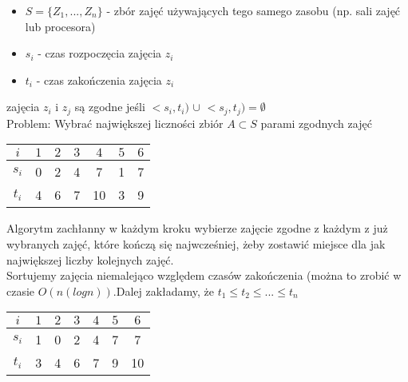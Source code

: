 \begin{itemize}
\item $S = \{ Z_1,...,Z_n \}$ - zbór zajęć używających tego samego zasobu (np. sali zajęć lub procesora) 
\item $s_i$ - czas rozpoczęcia zajęcia $z_i$
\item $t_i$ - czas zakończenia zajęcia $z_i$
\end{itemize}
zajęcia $z_i$ i $z_j$ są zgodne jeśli $<s_i,t_i)$ $\cup$ $<s_j,t_j) = \emptyset$ \\
Problem: Wybrać największej liczności zbiór $A \subset S$ parami zgodnych zajęć
\begin{center}
\begin{tabular}{ c | c | c | c | c | c | c }
  $i$ & $1$	& $2$ & $3$ & $4$ & $5$ & $6$ \\ \hline
  $s_i$ & 0	&  2  & 4 	& 7 & 1 & 7 \\ \hline
  $t_i$ & 4	&  6  & 7 	& 10 & 3 & 9 \\  
\end{tabular}
\end{center}

Algorytm zachłanny w każdym kroku wybierze zajęcie zgodne z każdym z już wybranych zajęć, które kończą się najwcześniej, żeby zostawić miejsce dla jak największej liczby kolejnych zajęć.\\
Sortujemy zajęcia niemalejąco względem czasów zakończenia (można to zrobić w czasie $O(n(logn))$.Dalej zakładamy, że $t_1 \leq t_2 \leq ... \leq t_n$

\begin{center}
\begin{tabular}{ c | c | c | c | c | c | c }
  $i$ & $1$	& $2$ & $3$ & $4$ & $5$ & $6$ \\ \hline
  $s_i$ & 1	&  0  &  2	&  4  &  7  & 7 \\ \hline
  $t_i$ & 3	&  4  &  6	&  7  &  9  & 10 \\  
\end{tabular}
\end{center}
